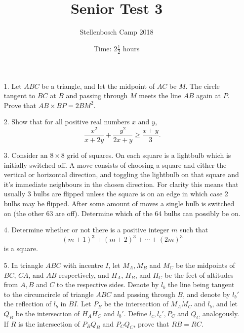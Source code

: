 \documentclass[a4paper, 12pt]{article}
\title{Senior Test 3}
\author{Stellenbosch Camp 2018}
\date{Time: $2 \frac{1}{2}$ hours}
\begin{document}
 \maketitle

\begin{enumerate}
\item[1.] Let $ABC$ be a triangle, and let the midpoint of $AC$ be $M$. The circle tangent to $BC$ at $B$ and passing through $M$ meets the line $AB$ again at $P$. Prove that $AB \times BP = 2 BM^2$.
\vspace{7pt}

\item[2.]
Show that for all positive real numbers $x$ and $y$,
\[ \frac{x^2}{x+2y} +\frac{y^2}{2x+y} \geq \frac{x+y}{3}. \]
\vspace{5pt}

\item[3.]
Consider an $8 \times 8$ grid of squares. On each square is a lightbulb which is initially switched off. A move consists of choosing a square and either the vertical or horizontal direction, and toggling the lightbulb on that square and it's immediate neighbours in the chosen direction. For clarity this means that usually 3 bulbs are flipped unless the square is on an edge in which case 2 bulbs may be flipped. After some amount of moves a single bulb is switched on (the other 63 are off). Determine which of the 64 bulbs can possibly be on. 
\vspace{7pt}

\item[4.]
Determine whether or not there is a positive integer $m$ such that
\[ (m+1)^3 +(m+2)^3 +\dotsb +(2m)^3 \]
is a square.

\vspace{7pt}

\item[5.]  In triangle $ABC$ with incentre $I$, let $M_A, M_B$ and $M_C$ be the midpoints of $BC$, $CA$, and $AB$ respectively, and $H_A$, $H_B$, and $H_C$ be the feet of altitudes from $A, B$ and $C$ to the respective sides. Denote by $l_b$ the line being tangent to the circumcircle of triangle $ABC$ and passing through $B$, and denote by $l_b'$ the reflection of $l_b$ in $BI$. Let $P_B$ be the intersection of $M_A M_C$ and $l_b$, and let $Q_B$ be the intersection of $H_A H_C$ and $l_b'$. Define $l_c, l_c', P_C$ and $Q_C$ analogously. If $R$ is the intersection of $P_B Q_B$ and $P_C Q_C$, prove that $RB = RC$.

\end{enumerate}
\end{document}
